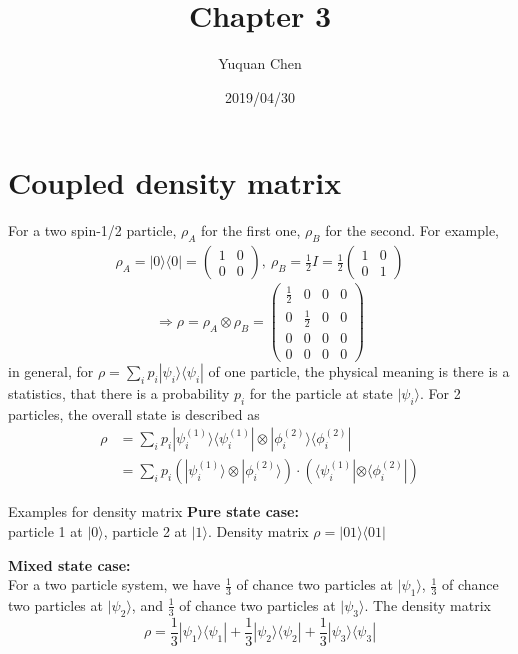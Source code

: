 \documentclass[UTF8,12pt]{article} %
\begin{document}
\title{Chapter 3}
\author{Yuquan Chen}
\date{2019/04/30} %
\maketitle

\section{Coupled density matrix}

For a two spin-1/2 particle, $\rho_{A}$ for the first one, $\rho_{B}$ for the second. For example, 
\begin{align*}
\rho_{A} = |0\rangle\langle 0| = \begin{pmatrix}1&0\\0&0\end{pmatrix},~ \rho_{B} = \frac{1}{2} I = \frac{1}{2}\begin{pmatrix}1&0\\0&1\end{pmatrix}
\end{align*}
$$\Rightarrow \rho = \rho_{A} \otimes \rho_{B} = \begin{pmatrix}\frac{1}{2}&0&0&0\\0&\frac{1}{2}&0&0\\0&0&0&0\\0&0&0&0\end{pmatrix}$$
in general, for $\rho = \sum_{i}p_{i}|\psi_{i}\rangle\langle \psi_{i}|$ of one particle, the physical meaning is there is a statistics, that there is a probability $p_{i}$ for the particle at state $|\psi_{i}\rangle$. For 2 particles, the overall state is described as
\begin{align}
\rho &= \sum_{i}p_{i}|\psi_{i}^{(1)}\rangle\langle\psi_{i}^{(1)}| \otimes |\phi_{i}^{(2)}\rangle\langle\phi_{i}^{(2)}| \\
&= \sum_{i} p_{i}\left(|\psi_{i}^{(1)}\rangle \otimes |\phi_{i}^{(2)}\rangle\right) \cdot \left(\langle\psi_{i}^{(1)}|\otimes\langle\phi_{i}^{(2)}|\right)
\end{align}

\begin{myboxes}{Examples for density matrix}{}
\textbf{Pure state case:}\\particle 1 at $|0\rangle$, particle 2 at $|1\rangle$. Density matrix $\rho = |01\rangle\langle 01|$\\\par
\textbf{Mixed state case:}\\For a two particle system, we have $\frac{1}{3}$ of chance two particles at $|\psi_{1}\rangle$, $\frac{1}{3}$ of chance two particles at $|\psi_{2}\rangle$, and $\frac{1}{3}$ of chance two particles at $|\psi_{3}\rangle$. The density matrix
$$\rho = \frac{1}{3}|\psi_{1}\rangle\langle\psi_{1}| + \frac{1}{3}|\psi_{2}\rangle\langle\psi_{2}| + \frac{1}{3}|\psi_{3}\rangle\langle\psi_{3}|$$
\end{myboxes}
\end{document}
